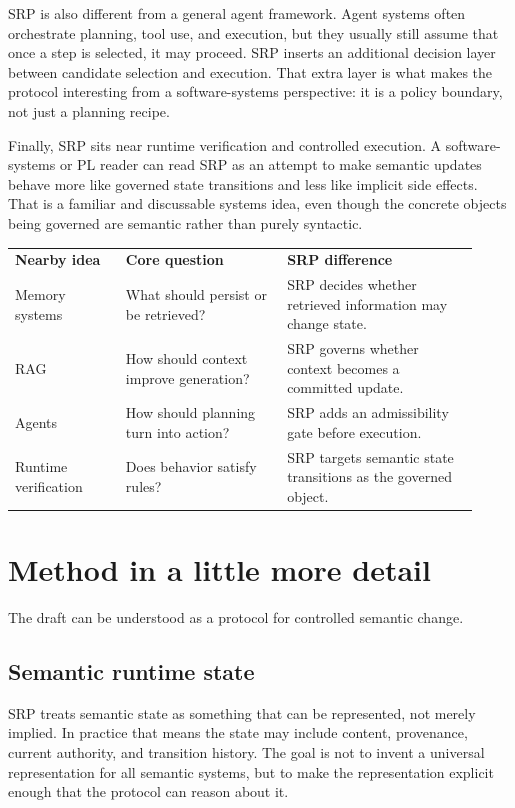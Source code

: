 \documentclass[10pt]{article}
\begin{document}
SRP is also different from a general agent framework. Agent systems often orchestrate planning, tool use, and execution, but they usually still assume that once a step is selected, it may proceed. SRP inserts an additional decision layer between candidate selection and execution. That extra layer is what makes the protocol interesting from a software-systems perspective: it is a policy boundary, not just a planning recipe.

Finally, SRP sits near runtime verification and controlled execution. A software-systems or PL reader can read SRP as an attempt to make semantic updates behave more like governed state transitions and less like implicit side effects. That is a familiar and discussable systems idea, even though the concrete objects being governed are semantic rather than purely syntactic.

\begin{center}
\begin{tabular}{p{0.22\linewidth} p{0.32\linewidth} p{0.38\linewidth}}
\textbf{Nearby idea} & \textbf{Core question} & \textbf{SRP difference} \\
Memory systems & What should persist or be retrieved? & SRP decides whether retrieved information may change state. \\
RAG & How should context improve generation? & SRP governs whether context becomes a committed update. \\
Agents & How should planning turn into action? & SRP adds an admissibility gate before execution. \\
Runtime verification & Does behavior satisfy rules? & SRP targets semantic state transitions as the governed object. \\
\end{tabular}
\end{center}

\section{Method in a little more detail}
The draft can be understood as a protocol for controlled semantic change.

\subsection*{Semantic runtime state}
SRP treats semantic state as something that can be represented, not merely implied. In practice that means the state may include content, provenance, current authority, and transition history. The goal is not to invent a universal representation for all semantic systems, but to make the representation explicit enough that the protocol can reason about it.
\end{document}
